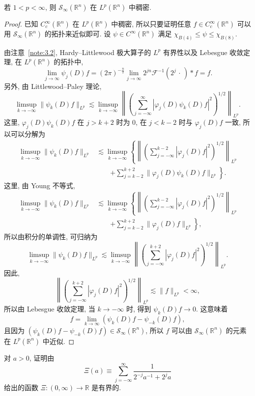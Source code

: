 \begin{corollary}\label{cor:6.1}
若 $1 < p < \infty$, 则 $\mathcal{S}_{\infty}(\mathbb{R}^{n})$ 在 $L^{p}(\mathbb{R}^{n})$ 中稠密.
\end{corollary}

\begin{proof}
已知 $C_{c}^{\infty}(\mathbb{R}^{n})$ 在 $L^{p}(\mathbb{R}^{n})$ 中稠密, 所以只要证明任意 $f \in C_{c}^{\infty}(\mathbb{R}^{n})$ 可以用 $\mathcal{S}_{\infty}(\mathbb{R}^{n})$ 的拓扑来近似即可. 设 $\psi \in C^{\infty}(\mathbb{R}^{n})$ 满足 $\chi_{B(4)} \leq \psi \leq \chi_{B(8)}$.

由注意~\ref{note:3.2}, Hardy--Littlewood 极大算子的 $L^{p}$ 有界性以及 Lebesgue 收敛定理, 在 $L^{p}(\mathbb{R}^{n})$ 的拓扑中,
\[
\lim_{j \to \infty}\psi_{j}(D)f = (2\pi)^{-\frac{n}{2}}\lim_{j \to \infty}2^{jn}\mathcal{F}^{-1}(2^{j}\,\cdot\,) * f = f.
\]
另外, 由 Littlewood--Paley 理论,
\[
\limsup_{k \to -\infty}\|\psi_{k}(D)f\|_{L^{p}} \lesssim \limsup_{k \to -\infty}\left\|\left(\sum_{j=-\infty}^{\infty}|\varphi_{j}(D)\psi_{k}(D)f|^{2}\right)^{1/2}\right\|_{L^{p}}.
\]
这里, $\varphi_{j}(D)\psi_{k}(D)f$ 在 $j > k+2$ 时为 $0$, 在 $j < k-2$ 时与 $\varphi_{j}(D)f$ 一致, 所以可以分解为
\[
\begin{aligned}
\limsup_{k \to -\infty}\|\psi_{k}(D)f\|_{L^{p}} &\lesssim \limsup_{k \to -\infty}\left\{\left\|\left(\sum_{j=-\infty}^{k-2}|\varphi_{j}(D)f|^{2}\right)^{1/2}\right\|_{L^{p}}\right. \\
&\qquad \left. + \sum_{j=k-2}^{k+2}\|\varphi_{j}(D)\psi_{k}(D)f\|_{L^{p}}\right\}.
\end{aligned}
\]
这里, 由 Young 不等式,
\[
\begin{aligned}
\limsup_{k \to -\infty}\|\psi_{k}(D)f\|_{L^{p}} &\lesssim \limsup_{k \to -\infty}\left\{\left\|\left(\sum_{j=-\infty}^{k-2}|\varphi_{j}(D)f|^{2}\right)^{1/2}\right\|_{L^{p}}\right. \\
&\qquad \left. + \sum_{j=k-2}^{k+2}\|\varphi_{j}(D)f\|_{L^{p}}\right\},
\end{aligned}
\]
所以由积分的单调性, 可归纳为
\[
\limsup_{k \to -\infty}\|\psi_{k}(D)f\|_{L^{p}} \lesssim \limsup_{k \to -\infty}\left\|\left(\sum_{j=-\infty}^{k+2}|\varphi_{j}(D)f|^{2}\right)^{1/2}\right\|_{L^{p}}.
\]
因此,
\[
\left\|\left(\sum_{j=-\infty}^{k+2}|\varphi_{j}(D)f|^{2}\right)^{1/2}\right\|_{L^{p}} \lesssim \|f\|_{L^{p}} < \infty,
\]
所以由 Lebesgue 收敛定理, 当 $k \to -\infty$ 时, 得到 $\psi_{k}(D)f \to 0$. 这意味着
\[
f = \lim_{k \to \infty}(\psi_{k}(D)f - \psi_{-k}(D)f),
\]
且因为 $(\psi_{k}(D)f - \psi_{-k}(D)f) \in \mathcal{S}_{\infty}(\mathbb{R}^{n})$, 所以 $f$ 可以由 $\mathcal{S}_{\infty}(\mathbb{R}^{n})$ 的元素在 $L^{p}(\mathbb{R}^{n})$ 中近似.
\end{proof}

\begin{exercise}\label{exer:6.1}
对 $a > 0$, 证明由
\[
\Xi(a) \equiv \sum_{j=-\infty}^{\infty}\frac{1}{2^{-j}a^{-1} + 2^{j}a}
\]
给出的函数 $\Xi: (0,\infty) \to \mathbb{R}$ 是有界的.
\end{exercise}
